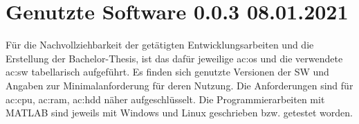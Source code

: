 %
\chapter{Genutzte Software 0.0.3 08.01.2021}\label{ch:genutzte-sw}

Für die Nachvollziehbarkeit der getätigten Entwicklungsarbeiten und die Erstellung der Bachelor-Thesis, ist das dafür jeweilige \gls{ac:os}
und die verwendete \gls{ac:sw} tabellarisch aufgeführt. Es finden sich genutzte Versionen der SW und Angaben zur Minimalanforderung für deren
Nutzung. Die Anforderungen sind für \gls{ac:cpu}, \gls{ac:ram}, \gls{ac:hdd} näher aufgeschlüsselt. Die Programmierarbeiten mit MATLAB sind
jeweils mit Windows und Linux geschrieben bzw. getestet worden.

